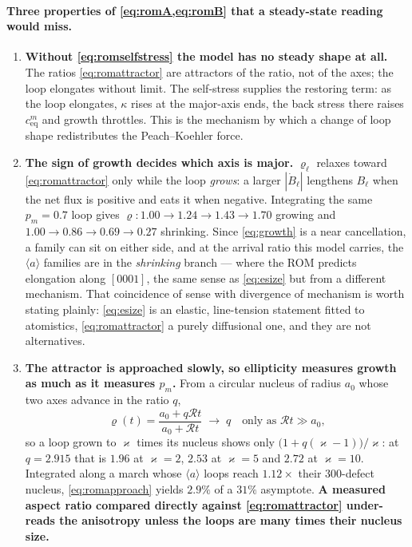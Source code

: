 \documentclass{article}
\newcommand{\aloop}{\ensuremath{\langle a\rangle}}
\begin{document}
\paragraph{Three properties of \cref{eq:romA,eq:romB} that a steady-state reading
would miss.}

\begin{enumerate}
\item \textbf{Without \cref{eq:romselfstress} the model has no steady shape at
      all.} The ratios \cref{eq:romattractor} are attractors of the ratio, not of
      the axes; the loop elongates without limit. The self-stress supplies the
      restoring term: as the loop elongates, $\kappa$ rises at the major-axis
      ends, the back stress there raises $c^{m}_{\mathrm{eq}}$ and growth
      throttles. This is the mechanism by which a change of loop shape
      redistributes the Peach--Koehler force.
\item \textbf{The sign of growth decides which axis is major.} $\varrho_\ell$
      relaxes toward \cref{eq:romattractor} only while the loop \emph{grows}: a
      larger $|\dot B_\ell|$ lengthens $B_\ell$ when the net flux is positive and
      eats it when negative. Integrating the same $p_m=0.7$ loop gives
      $\varrho:1.00\to1.24\to1.43\to1.70$ growing and
      $1.00\to0.86\to0.69\to0.27$ shrinking. Since \cref{eq:growth} is a near
      cancellation, a family can sit on either side, and at the arrival ratio this
      model carries, the \aloop{} families are in the \emph{shrinking} branch ---
      where the ROM predicts elongation along $[0001]$, the same sense as
      \cref{eq:esize} but from a different mechanism. That coincidence of sense
      with divergence of mechanism is worth stating plainly: \cref{eq:esize} is an
      elastic, line-tension statement fitted to atomistics, \cref{eq:romattractor}
      a purely diffusional one, and they are not alternatives.
\item \textbf{The attractor is approached slowly, so ellipticity measures growth
      as much as it measures $p_m$.} From a circular nucleus of radius $a_0$ whose
      two axes advance in the ratio $q$,
      \begin{equation}
        \varrho(t)=\frac{a_0+q\mathcal Rt}{a_0+\mathcal Rt}\;\longrightarrow\;q
        \quad\text{only as }\mathcal Rt\gg a_0,
        \label{eq:romapproach}
      \end{equation}
      so a loop grown to $\varkappa$ times its nucleus shows only
      $\bigl(1+q(\varkappa-1)\bigr)/\varkappa$: at $q=2.915$ that is $1.96$ at
      $\varkappa=2$, $2.53$ at $\varkappa=5$ and $2.72$ at $\varkappa=10$.
      Integrated along a march whose \aloop{} loops reach $1.12\times$ their
      $300$-defect nucleus, \cref{eq:romapproach} yields $2.9\%$ of a $31\%$
      asymptote. \textbf{A measured aspect ratio compared directly against
      \cref{eq:romattractor} under-reads the anisotropy unless the loops are many
      times their nucleus size.}
\end{enumerate}
\end{document}
